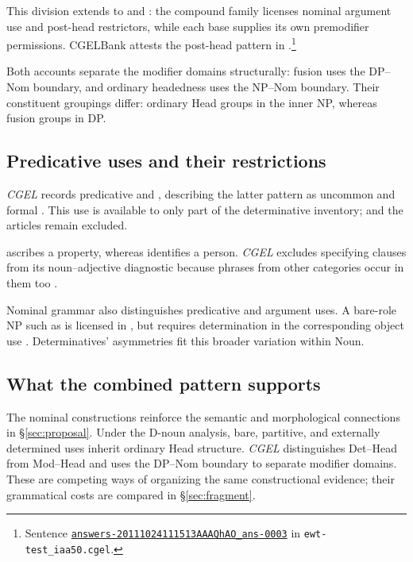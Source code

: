\documentclass[12pt]{article}
\begin{document}
This division extends to  and : the compound family licenses nominal argument use and post-head restrictors, while each base supplies its own premodifier permissions. CGELBank attests the post-head pattern in .\footnote{Sentence \href{https://github.com/nert-nlp/cgel/blob/d0a2c2d8c522b23d5aa879fc9cb94948f4285b2c/datasets/ewt-test_iaa50.cgel\#L179-L181}{\nolinkurl{answers-20111024111513AAAQhAO_ans-0003}} in \nolinkurl{ewt-test_iaa50.cgel}.}

Both accounts separate the modifier domains structurally: fusion uses the DP--Nom boundary, and ordinary headedness uses the NP--Nom boundary. Their constituent groupings differ: ordinary Head groups  in the inner NP, whereas fusion groups  in DP.

\subsection{Predicative uses and their restrictions}\label{sec:predication}

\textit{CGEL} records predicative  and , describing the latter pattern as uncommon and formal \citep[392, 395--396]{huddleston2002}. This use is available to only part of the determinative inventory;  and the articles remain excluded.

 ascribes a property, whereas  identifies a person. \textit{CGEL} excludes specifying  clauses from its noun--adjective diagnostic because phrases from other categories occur in them too \citep[536]{huddleston2002}.

Nominal grammar also distinguishes predicative and argument uses. A bare-role NP such as  is licensed in , but requires determination in the corresponding object use  \citep[328]{huddleston2002}. Determinatives' asymmetries fit this broader variation within Noun.

\subsection{What the combined pattern supports}\label{sec:cumulative}

The nominal constructions reinforce the semantic and morphological connections in §\ref{sec:proposal}. Under the D-noun analysis, bare, partitive, and externally determined uses inherit ordinary Head structure. \textit{CGEL} distinguishes Det--Head from Mod--Head and uses the DP--Nom boundary to separate modifier domains. These are competing ways of organizing the same constructional evidence; their grammatical costs are compared in §\ref{sec:fragment}.
\end{document}
